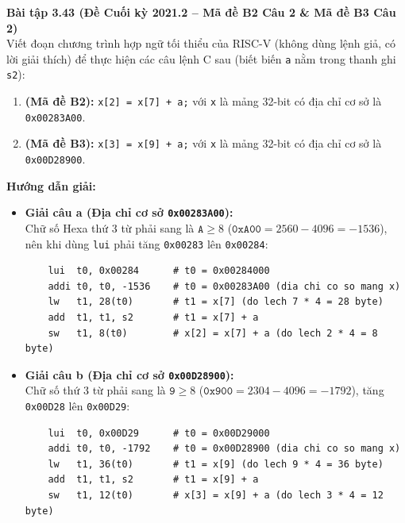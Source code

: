 \textbf{Bài tập 3.43 (Đề Cuối kỳ 2021.2 -- Mã đề B2 Câu 2 \& Mã đề B3 Câu 2)}\\
Viết đoạn chương trình hợp ngữ tối thiểu của RISC-V (không dùng lệnh giả, có lời giải thích) để thực hiện các câu lệnh C sau (biết biến \texttt{a} nằm trong thanh ghi \texttt{s2}):
\begin{enumerate}[label=\alph*)]
    \item \textbf{(Mã đề B2):} \texttt{x[2] = x[7] + a;} với \texttt{x} là mảng 32-bit có địa chỉ cơ sở là \texttt{0x00283A00}.
    \item \textbf{(Mã đề B3):} \texttt{x[3] = x[9] + a;} với \texttt{x} là mảng 32-bit có địa chỉ cơ sở là \texttt{0x00D28900}.
\end{enumerate}
\textbf{Hướng dẫn giải:}
\begin{itemize}
    \item \textbf{Giải câu a (Địa chỉ cơ sở \texttt{0x00283A00}):}\\
    Chữ số Hexa thứ 3 từ phải sang là $\texttt{A} \ge 8$ ($\texttt{0xA00} = 2560 - 4096 = -1536$), nên khi dùng \texttt{lui} phải tăng \texttt{0x00283} lên \texttt{0x00284}:

\noindent\begin{minipage}{\linewidth}
\begin{lstlisting}
    lui  t0, 0x00284      # t0 = 0x00284000
    addi t0, t0, -1536    # t0 = 0x00283A00 (dia chi co so mang x)
    lw   t1, 28(t0)       # t1 = x[7] (do lech 7 * 4 = 28 byte)
    add  t1, t1, s2       # t1 = x[7] + a
    sw   t1, 8(t0)        # x[2] = x[7] + a (do lech 2 * 4 = 8 byte)
\end{lstlisting}
\end{minipage}

    \item \textbf{Giải câu b (Địa chỉ cơ sở \texttt{0x00D28900}):}\\
    Chữ số thứ 3 từ phải sang là $\texttt{9} \ge 8$ ($\texttt{0x900} = 2304 - 4096 = -1792$), tăng \texttt{0x00D28} lên \texttt{0x00D29}:

\noindent\begin{minipage}{\linewidth}
\begin{lstlisting}
    lui  t0, 0x00D29      # t0 = 0x00D29000
    addi t0, t0, -1792    # t0 = 0x00D28900 (dia chi co so mang x)
    lw   t1, 36(t0)       # t1 = x[9] (do lech 9 * 4 = 36 byte)
    add  t1, t1, s2       # t1 = x[9] + a
    sw   t1, 12(t0)       # x[3] = x[9] + a (do lech 3 * 4 = 12 byte)
\end{lstlisting}
\end{minipage}
\end{itemize}

